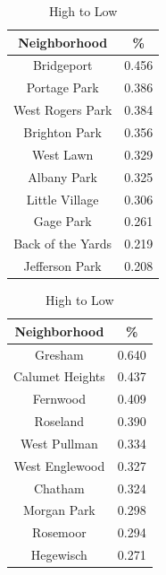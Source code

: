 \documentclass{article}
\theoremstyle{definition}
\theoremstyle{remark}
\begin{document}
\begin{table}[!htb]

\caption{Housing Rank Income Changes}\label{thelabel}
\begin{minipage}{.5\linewidth}
      \caption{Low to High}
      \centering
      
\begin{tabular}{||c | c ||} 
 \hline
Neighborhood &  \%\\[0.5ex] 
 \hline\hline
Bridgeport & 0.456 \\
Portage Park & 0.386 \\
West Rogers Park & 0.384 \\
Brighton Park & 0.356 \\
West Lawn & 0.329 \\
Albany Park & 0.325 \\
Little Village & 0.306 \\
Gage Park & 0.261 \\
Back of the Yards & 0.219 \\
Jefferson Park & 0.208 \\
\hline
 \end{tabular}

\end{minipage}%
    \begin{minipage}{.5\linewidth}
      \centering
\caption{High to Low}\label{thelabel}

\begin{tabular}{||c | c ||} 
 \hline
Neighborhood &  \%\\[0.5ex] 
 \hline\hline
Gresham & 0.640 \\
Calumet Heights & 0.437 \\
Fernwood & 0.409 \\
Roseland & 0.390 \\
West Pullman & 0.334 \\
West Englewood & 0.327 \\
Chatham & 0.324 \\
Morgan Park & 0.298 \\
Rosemoor & 0.294 \\
Hegewisch & 0.271 \\
\hline
\end{tabular}
\end{minipage} 
\end{table}
\end{document}
